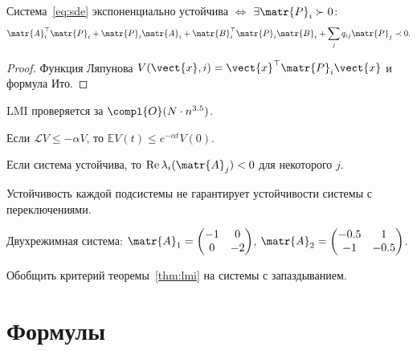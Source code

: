 \documentclass[font=modern]{cmcmsuthesis-doctoral}
\begin{document}
\begin{theorem}\label{thm:lmi}
Система~\eqref{eq:sde} экспоненциально устойчива $\Leftrightarrow$
$\exists\matr{P}_i\succ 0$:
\[\matr{A}_i^\top\matr{P}_i+\matr{P}_i\matr{A}_i
+\matr{B}_i^\top\matr{P}_i\matr{B}_i+\sum_j q_{ij}\matr{P}_j\prec 0.\]
\end{theorem}

\begin{proof}
Функция Ляпунова $V(\vect{x},i)=\vect{x}^\top\matr{P}_i\vect{x}$
и формула Ито.
\end{proof}

\begin{corollary}\label{cor:sdp}
LMI проверяется за $\compl{O}(N\cdot n^{3.5})$.
\end{corollary}

\begin{lemma}\label{lem:lyapunov}
Если $\mathcal{L}V\leq-\alpha V$, то
$\mathbb{E}V(t)\leq e^{-\alpha t}V(0)$.
\end{lemma}

\begin{proposition}\label{prop:necessary}
Если система устойчива, то $\operatorname{Re}\lambda_i(\matr{A}_j)<0$
для некоторого $j$.
\end{proposition}

\begin{remark}\label{rem:switching}
Устойчивость каждой подсистемы не гарантирует устойчивости
системы с переключениями.
\end{remark}

\begin{example}\label{ex:two-mode}
Двухрежимная система: $\matr{A}_1=\begin{pmatrix}-1&0\\0&-2\end{pmatrix}$,
$\matr{A}_2=\begin{pmatrix}-0.5&1\\-1&-0.5\end{pmatrix}$.
\end{example}

\begin{problem}\label{prob:delay}
Обобщить критерий теоремы~\ref{thm:lmi} на системы с запаздыванием.
\end{problem}

\chapter{Формулы}\label{ch:formulas}
\end{document}
